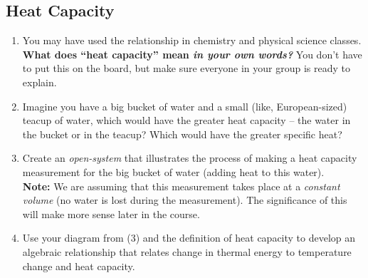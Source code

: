 \subsection{Heat Capacity}
\label{1.2.1A}

\begin{enumerate}
	\item You may have used the relationship  in chemistry and physical science classes. \textbf{What does ``heat capacity'' mean \emph{in your own words?}} You don't have to put this on the board, but make sure everyone in your group is ready to explain.
		
		
	\item Imagine you have a big bucket of water and a small (like, European-sized) teacup of water, which would have the greater heat capacity -- the water in the bucket or in the teacup? Which would have the greater specific heat?
		
		
	\item Create an \emph{open-system \EnergyDiagram{}} that illustrates the process of making a heat capacity measurement for the big bucket of water (adding heat to this water).\\
	\textbf{Note:} We are assuming that this measurement takes place at a \emph{constant volume} (no water is lost during the measurement). The significance of this will make more sense later in the course.
	\label{1.2.1A3}
		
		
	\item Use your diagram from (3) and the definition of heat capacity to develop an algebraic relationship that relates change in thermal energy to temperature change and heat capacity.
		

\end{enumerate}
